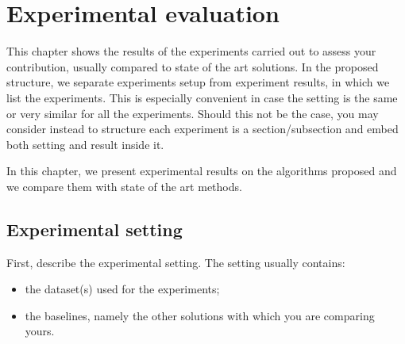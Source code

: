 \chapter{Experimental evaluation}
\label{ch:experiments}

This chapter shows the results of the experiments carried out to assess your contribution, usually compared to state of the art solutions. In the proposed structure, we separate experiments setup from experiment results, in which we list the experiments. This is especially convenient in case the setting is the same or very similar for all the experiments. Should this not be the case, you may consider instead to structure each experiment is a section/subsection and embed both setting and result inside it.

\begin{example}
In this chapter, we present experimental results on the algorithms proposed and we compare them with state of the art methods.
\end{example}

\section{Experimental setting}

First, describe the experimental setting. The setting usually contains:
\begin{itemize}
\item the dataset(s) used for the experiments;
\item the baselines, namely the other solutions with which you are comparing yours.
\end{itemize}

